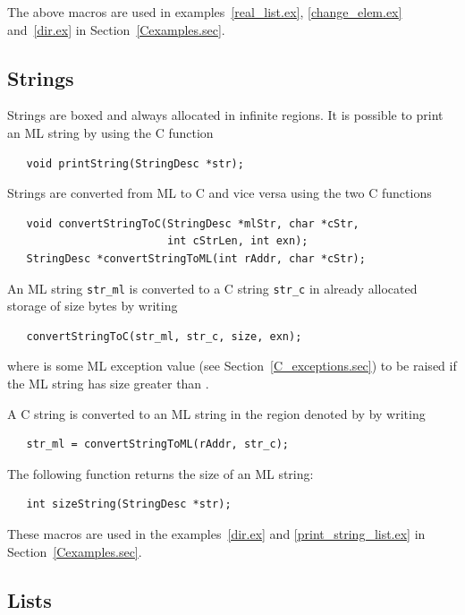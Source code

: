 \documentclass[12pt]{book}
\begin{document}
The above macros are used in examples~\ref{real_list.ex},
\ref{change_elem.ex} and~\ref{dir.ex} in Section~\ref{Cexamples.sec}.

\subsection{Strings}
Strings are boxed and always allocated in infinite regions. It is possible
to print an ML string by using the C function
%
\begin{verbatim}
   void printString(StringDesc *str);
\end{verbatim}

Strings are converted from ML to C and vice versa using the two C 
functions
%
%
\begin{verbatim}
   void convertStringToC(StringDesc *mlStr, char *cStr, 
                         int cStrLen, int exn);
   StringDesc *convertStringToML(int rAddr, char *cStr);
\end{verbatim}
An ML string \verb|str_ml| is converted to a C
string \verb|str_c| in already allocated storage of size  bytes by writing
\begin{verbatim}
   convertStringToC(str_ml, str_c, size, exn);
\end{verbatim}
where  is some ML exception value (see
Section~\ref{C_exceptions.sec}) to be raised if the ML string has size
greater than .  

A C string is converted to an ML string in the region denoted by
 by writing
\begin{verbatim}
   str_ml = convertStringToML(rAddr, str_c);
\end{verbatim}

The following function returns the size of an ML string:
%
\begin{verbatim}
   int sizeString(StringDesc *str);
\end{verbatim}

These macros are used in the examples~\ref{dir.ex} and
\ref{print_string_list.ex} in Section~\ref{Cexamples.sec}.

\subsection{Lists}
\end{document}
